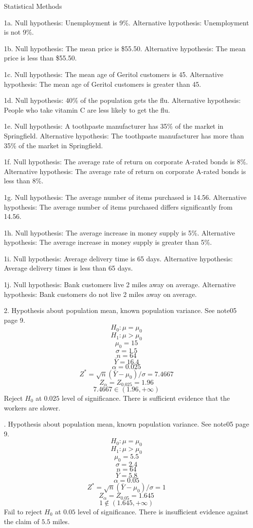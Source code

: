 \parindent=0pt

Statistical Methods

\bigskip
1a.
Null hypothesis: Unemployment is 9\%.
Alternative hypothesis: Unemployment is not 9\%.

\bigskip
1b.
Null hypothesis: The mean price is \$55{.}50.
Alternative hypothesis: The mean price is less than \$55{.}50.

\bigskip
1c.
Null hypothesis: The mean age of Geritol customers is 45.
Alternative hypothesis: The mean age of Geritol customers is
greater than 45.

\bigskip
1d.
Null hypothesis: 40\% of the population gets the flu.
Alternative hypothesis: People who take vitamin C are less likely to
get the flu.

\bigskip
1e.
Null hypothesis: A toothpaste manufacturer has 35\% of the
market in Springfield.
Alternative hypothesis:
The toothpaste manufacturer has more than 35\% of the market in
Springfield.

\bigskip
1f.
Null hypothesis:
The average rate of return on corporate A-rated bonds is 8\%.
Alternative hypothesis:
The average rate of return on corporate A-rated bonds is less than 8\%.

\bigskip
1g.
Null hypothesis:
The average number of items purchased is 14{.}56.
Alternative hypothesis:
The average number of items purchased differs significantly from 14{.}56.

\bigskip
1h.
Null hypothesis:
The average increase in money supply is 5\%.
Alternative hypothesis:
The average increase in money supply is greater than 5\%.

\bigskip
1i.
Null hypothesis:
Average delivery time is 65 days.
Alternative hypothesis:
Average delivery times is less than 65 days.

\bigskip
1j.
Null hypothesis:
Bank customers live 2 miles away on average.
Alternative hypothesis:
Bank customers do not live 2 miles away on average.

\vfill
\eject

2. Hypothesis about population mean, known population variance.
See note05 page 9.
$$H_0: \mu=\mu_0$$
$$H_1: \mu>\mu_0$$
$$\mu_0=15$$
$$\sigma=1.5$$
$$n=64$$
$$\bar Y=16.4$$
$$\alpha=0.025$$
$$Z^*=\sqrt n(\bar Y-\mu_0)/\sigma=7.4667$$
$$Z_\alpha=Z_{0.025}=1.96$$
$$7.4667\in(1.96,+\infty)$$
Reject $H_0$ at $0.025$ level of significance.
There is sufficient evidence that the workers are slower.

. Hypothesis about population mean, known population variance.
See note05 page 9.
$$H_0: \mu=\mu_0$$
$$H_1: \mu>\mu_0$$
$$\mu_0=5.5$$
$$\sigma=2.4$$
$$n=64$$
$$\bar Y=5.8$$
$$\alpha=0.05$$
$$Z^*=\sqrt n(\bar Y-\mu_0)/\sigma=1$$
$$Z_\alpha=Z_{0.05}=1.645$$
$$1\not\in(1.645,+\infty)$$
Fail to reject $H_0$ at $0.05$ level of significance.
There is insufficient evidence against the claim of $5.5$ miles.

